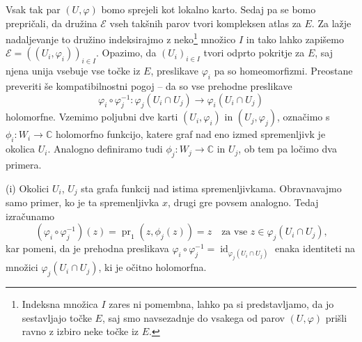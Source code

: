 \documentclass[mat1]{fmfdelo}
\numberwithin{equation}{section}
\newcommand{\C}{\mathbb C}
\newcommand{\inv}{^{-1}}
\DeclareMathOperator{\id}{id}
\DeclareMathOperator{\pr}{pr}
\theoremstyle{definition}
\begin{document}
Vsak tak par $(U, \varphi)$ bomo sprejeli kot lokalno karto. 
Sedaj pa se bomo prepričali, da družina $\mathcal{E}$ vseh takšnih parov tvori kompleksen atlas za $E$. Za lažje nadaljevanje to družino indeksirajmo z neko\footnote{Indeksna množica $I$ zares ni pomembna, lahko pa si predstavljamo, da jo sestavljajo točke $E$, saj smo navsezadnje do vsakega od parov $(U, \varphi)$ prišli ravno z izbiro neke točke iz $E$. } množico $I$ in tako lahko zapišemo $\mathcal{E} = ((U_i, \varphi_i))_{i \in I}$. 
Opazimo, da  
$(U_i)_{i \in I}$ tvori odprto pokritje za $E$, saj njena unija vsebuje vse točke iz $E$, preslikave $\varphi_i$ pa so homeomorfizmi. Preostane preveriti še kompatibilnostni pogoj -- da so vse prehodne preslikave
\[
    \varphi_i \circ \varphi_j\inv : \varphi_j(U_i \cap U_j) \to \varphi_i(U_i \cap U_j)  
\]
holomorfne. Vzemimo poljubni dve karti $(U_i, \varphi_i)$ in $(U_j, \varphi_j)$, označimo s $\phi_i : W_i \to \C$ holomorfno funkcijo, katere graf nad eno izmed spremenljivk je okolica $U_i$. Analogno definiramo tudi $\phi_j : W_j \to \C$ in $U_j$, ob tem pa ločimo dva primera. 

(i) Okolici $U_i$, $U_j$ sta grafa funkcij nad istima spremenljivkama. Obravnavajmo samo primer, ko je ta spremenljivka $x$, drugi gre povsem analogno. Tedaj izračunamo
\[
    (\varphi_i \circ \varphi_j\inv)(z) = \pr_1(z, \phi_j(z)) = z \quad \text{za vse $z \in \varphi_j(U_i \cap U_j)$,}
\] 
kar pomeni, da je prehodna preslikava $\varphi_i \circ \varphi_j\inv = \id_{\varphi_j(U_i \cap U_j)}$ enaka identiteti na množici $\varphi_j(U_i \cap U_j)$, ki je očitno holomorfna. 
\end{document}
